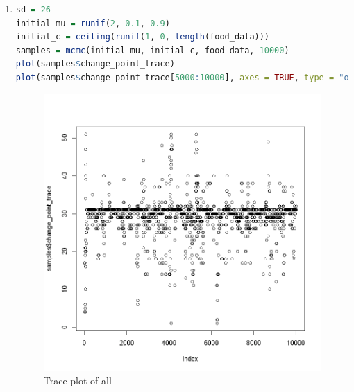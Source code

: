 \documentclass{article}
\begin{document}
\begin{enumerate}
\item 
\begin{lstlisting}[language=R]
sd = 26
initial_mu = runif(2, 0.1, 0.9)
initial_c = ceiling(runif(1, 0, length(food_data)))
samples = mcmc(initial_mu, initial_c, food_data, 10000)
plot(samples$change_point_trace)
plot(samples$change_point_trace[5000:10000], axes = TRUE, type = "o", col = rgb(red = 0, green = 0, blue = 0, alpha = 0.2))  
\end{lstlisting}
\begin{figure}[H]
    \begin{minipage}{0.5\textwidth}
        \centering
        \includegraphics[width=\linewidth]{trace_all.png}
        \caption{Trace plot of all}
        \label{fig:trace_all}
    \end{minipage}
    \begin{minipage}{0.5\textwidth}
        \centering

\end{minipage}
\end{figure}
\end{enumerate}
\end{document}

